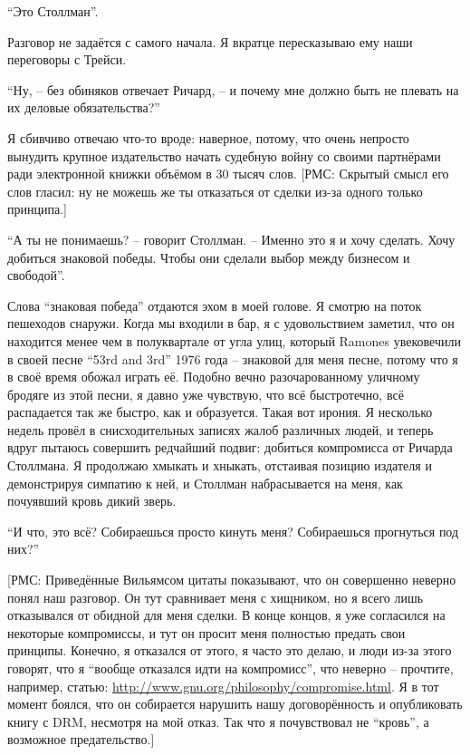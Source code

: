 \enquote{Это Столлман}.

Разговор не задаётся с самого начала. Я вкратце пересказываю ему наши переговоры с Трейси.

\enquote{Ну, -- без обиняков отвечает Ричард, -- и почему мне должно быть не плевать на их деловые обязательства?}

Я сбивчиво отвечаю что-то вроде: наверное, потому, что очень непросто вынудить крупное издательство начать судебную войну со своими партнёрами ради электронной книжки объёмом в 30 тысяч слов. [РМС: Скрытый смысл его слов гласил: ну не можешь же ты отказаться от сделки из-за одного только принципа.]

\enquote{А ты не понимаешь? -- говорит Столлман. -- Именно это я и хочу сделать. Хочу добиться знаковой победы. Чтобы они сделали выбор между бизнесом и свободой}.

Слова \enquote{знаковая победа} отдаются эхом в моей голове. Я смотрю на поток пешеходов снаружи. Когда мы входили в бар, я с удовольствием заметил, что он находится менее чем в полуквартале от угла улиц, который Ramones увековечили в своей песне \enquote{53rd and 3rd} 1976 года -- знаковой для меня песне, потому что я в своё время обожал играть её. Подобно вечно разочарованному уличному бродяге из этой песни, я давно уже чувствую, что всё быстротечно, всё распадается так же быстро, как и образуется. Такая вот ирония. Я несколько недель провёл в снисходительных записях жалоб различных людей, и теперь вдруг пытаюсь совершить редчайший подвиг: добиться компромисса от Ричарда Столлмана. Я продолжаю хмыкать и хныкать, отстаивая позицию издателя и демонстрируя симпатию к ней, и Столлман набрасывается на меня, как почуявший кровь дикий зверь.

\enquote{И что, это всё? Собираешься просто кинуть меня? Собираешься прогнуться под них?}

[РМС: Приведённые Вильямсом цитаты показывают, что он совершенно неверно понял наш разговор. Он тут сравнивает меня с хищником, но я всего лишь отказывался от обидной для меня сделки. В конце концов, я уже согласился на некоторые компромиссы, и тут он просит меня полностью предать свои принципы. Конечно, я отказался от этого, я часто это делаю, и люди из-за этого говорят, что я \enquote{вообще отказался идти на компромисс}, что неверно -- прочтите, например, статью: \url{http://www.gnu.org/philosophy/compromise.html}. Я в тот момент боялся, что он собирается нарушить нашу договорённость и опубликовать книгу с DRM, несмотря на мой отказ. Так что я почувствовал не \enquote{кровь}, а возможное предательство.]

